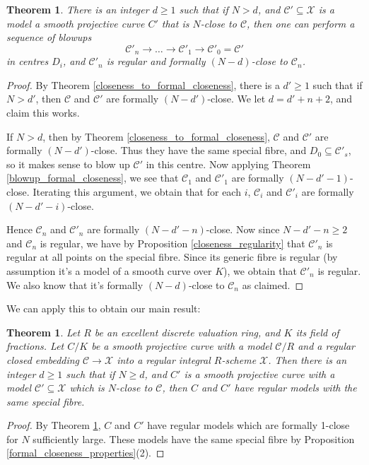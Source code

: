\documentclass{article}
\theoremstyle{definition}
\theoremstyle{plain}
\newtheorem{thm}[defn]{Theorem}
\theoremstyle{remark}
\begin{document}
	\begin{thm}\label{close_models_regular}
		There is an integer $d\ge 1$ such that if $N> d$, and $\mathcal{C}'\subseteq \mathcal{X}$ is a model a smooth projective curve $C'$ that is $N$-close to $\mathcal{C}$, then one can perform a sequence of blowups
		\[\mathcal{C}'_n \to \ldots \to \mathcal{C}'_1\to \mathcal{C}'_0 = \mathcal{C}' \]
		in centres $D_i$, and $\mathcal{C}'_n$ is regular and formally $(N-d)$-close to $\mathcal{C}_n$.
	\end{thm}
	\begin{proof}
		By Theorem \ref{closeness_to_formal_closeness}, there is a $d'\ge 1$ such that if $N> d'$, then $\mathcal{C}$ and $\mathcal{C}'$ are formally $(N-d')$-close. We let $d = d' + n + 2$, and claim this works.
		
		If $N> d$, then by Theorem \ref{closeness_to_formal_closeness}, $\mathcal{C}$ and $\mathcal{C}'$ are formally $(N-d')$-close. Thus they have the same special fibre, and $D_0\subseteq \mathcal{C}'_s$, so it makes sense to blow up $\mathcal{C}'$ in this centre. Now applying Theorem \ref{blowup_formal_closeness}, we see that $\mathcal{C}_1$ and $\mathcal{C}'_1$ are formally $(N-d'-1)$-close. Iterating this argument, we obtain that for each $i$, $\mathcal{C}_i$ and $\mathcal{C}'_i$ are formally $(N-d'-i)$-close.
		
		Hence $\mathcal{C}_n$ and $\mathcal{C}'_n$ are formally $(N-d'-n)$-close. Now since $N-d'-n\ge 2$ and $\mathcal{C}_n$ is regular, we have by Proposition \ref{closeness_regularity} that $\mathcal{C}'_n$ is regular at all points on the special fibre. Since its generic fibre is regular (by assumption it's a model of a smooth curve over $K$), we obtain that $\mathcal{C}'_n$ is regular. We also know that it's formally $(N-d)$-close to $\mathcal{C}_n$ as claimed.
	\end{proof}
	We can apply this to obtain our main result:
	\begin{thm}\label{main_result}	
	Let $R$ be an excellent discrete valuation ring, and $K$ its field of fractions. Let $C/K$ be a smooth projective curve with a model $\mathcal{C}/R$ and a regular closed embedding $\mathcal{C}\to \mathcal{X}$ into a regular integral $R$-scheme $\mathcal{X}$. Then there is an integer $d\ge 1$ such that if $N\ge d$, and $C'$ is a smooth projective curve with a model $\mathcal{C}'\subseteq \mathcal{X}$ which is $N$-close to $\mathcal{C}$, then $C$ and $C'$ have regular models with the same special fibre.
	\end{thm}
	\begin{proof}
		By Theorem \ref{close_models_regular}, $C$ and $C'$ have regular models which are formally 1-close for $N$ sufficiently large. These models have the same special fibre by Proposition \ref{formal_closeness_properties}(2).
	\end{proof}
\end{document}
